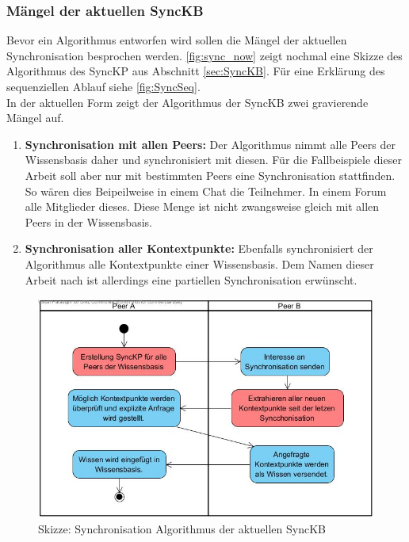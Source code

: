 \documentclass[a4paper]{article}
\begin{document}
	\subsubsection{Mängel der aktuellen SyncKB}
	
	Bevor ein Algorithmus entworfen wird sollen die Mängel der aktuellen 
	Synchronisation besprochen werden. \autoref{fig:sync_now} zeigt nochmal eine
	Skizze des Algorithmus des SyncKP aus Abschnitt \ref{sec:SyncKB}. Für 
	eine Erklärung des sequenziellen Ablauf siehe \autoref{fig:SyncSeq}. \\
	
	In der aktuellen Form zeigt der Algorithmus der SyncKB zwei gravierende Mängel
	auf.
	
	\begin{enumerate}
		\item \textbf{Synchronisation mit allen Peers:} Der Algorithmus nimmt alle
		Peers der Wissensbasis daher und synchronisiert mit diesen. Für die
		Fallbeispiele dieser Arbeit soll aber nur mit bestimmten Peers eine
		Synchronisation stattfinden. So wären dies Beipeilweise in einem Chat die
		Teilnehmer. In einem Forum alle Mitglieder dieses. Diese Menge ist
		nicht zwangsweise gleich mit allen Peers in der Wissensbasis.
		\item \textbf{Synchronisation aller Kontextpunkte:} Ebenfalls
		synchronisiert der Algorithmus alle Kontextpunkte einer Wissensbasis. 
		Dem Namen dieser Arbeit nach ist allerdings eine partiellen Synchronisation
		erwünscht.		
	\end{enumerate}
	
	\begin{figure}[H]
		\includegraphics[width=\linewidth]{../Bilder/sync_flaws.jpg}
		\caption{Skizze: Synchronisation Algorithmus der aktuellen SyncKB}
		\label{fig:sync_now}
	\end{figure}
	
\end{document}
